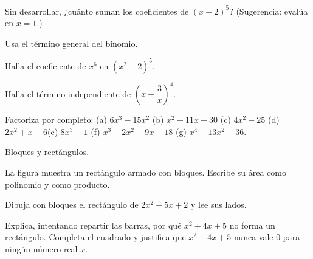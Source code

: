 \documentclass[11pt,a4paper]{article}
\def\X{1.7}\def\U{0.34}
\begin{document}
\begin{ejercicios}
\begin{ejercicios}
  \item Sin desarrollar, ¿cuánto suman los coeficientes de $(x-2)^5$? (Sugerencia: evalúa en $x=1$.)
  \end{ejercicios}
\item Usa el término general del binomio.
  \begin{ejercicios}
  \item Halla el coeficiente de $x^{6}$ en $(x^{2}+2)^{5}$.
  \item Halla el término independiente de $\left(x-\dfrac{3}{x}\right)^{4}$.
  \end{ejercicios}
\item Factoriza por completo:
  (a) $6x^3-15x^2$ \quad (b) $x^2-11x+30$ \quad (c) $4x^2-25$ \quad (d) $2x^2+x-6$\newline (e) $8x^3-1$ \quad
  (f) $x^3-2x^2-9x+18$ \quad (g) $x^4-13x^2+36$.
\item Bloques y rectángulos.
  \begin{ejercicios}
  \item La figura muestra un rectángulo armado con bloques. Escribe su área como polinomio y como producto.

    \smallskip
  \item Dibuja con bloques el rectángulo de $2x^2+5x+2$ y lee sus lados.
  \item Explica, intentando repartir las barras, por qué $x^2+4x+5$ no forma un rectángulo. Completa el cuadrado y
    justifica que $x^2+4x+5$ nunca vale $0$ para ningún número real $x$.
  \end{ejercicios}
\end{ejercicios}
\end{document}
